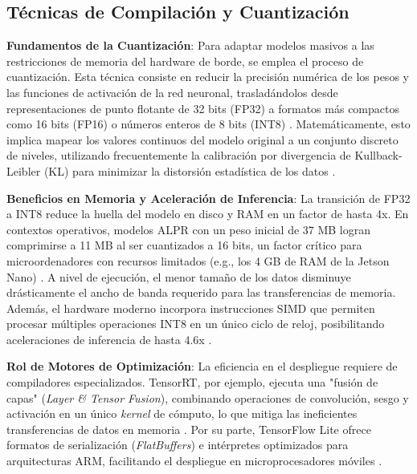 \subsection{Técnicas de Compilación y Cuantización}

\textbf{Fundamentos de la Cuantización}: 
Para adaptar modelos masivos a las restricciones de memoria del hardware de borde, se 
emplea el proceso de cuantización. Esta técnica consiste en reducir la precisión numérica 
de los pesos y las funciones de activación de la red neuronal, trasladándolos desde 
representaciones de punto flotante de 32 bits (FP32) a formatos más compactos como 16 bits 
(FP16) o números enteros de 8 bits (INT8) 
\parencite{sonnaraEfficientRealtimeLicense2025, swatiEfficientDeepLearning2024}. 
Matemáticamente, esto implica mapear los valores continuos del modelo original a un 
conjunto discreto de niveles, utilizando frecuentemente la calibración por divergencia 
de Kullback-Leibler (KL) para minimizar la distorsión estadística de los datos 
\parencite{ammarMultiStageDeepLearningBasedVehicle2023}.

\textbf{Beneficios en Memoria y Aceleración de Inferencia}: 
La transición de FP32 a INT8 reduce la huella del modelo en disco y RAM en un factor 
de hasta 4x. En contextos operativos, modelos ALPR con un peso inicial de 37 MB logran 
comprimirse a 11 MB al ser cuantizados a 16 bits, un factor crítico para microordenadores 
con recursos limitados (e.g., los 4 GB de RAM de la Jetson Nano) 
\parencite{sonnaraEfficientRealtimeLicense2025, swatiEfficientDeepLearning2024}. 
A nivel de ejecución, el menor tamaño de los datos disminuye drásticamente el ancho de 
banda requerido para las transferencias de memoria. Además, el hardware moderno incorpora 
instrucciones SIMD que permiten procesar múltiples operaciones INT8 en un único ciclo de 
reloj, posibilitando aceleraciones de inferencia de hasta 4.6x 
\parencite{ammarMultiStageDeepLearningBasedVehicle2023, sonnaraEfficientRealtimeLicense2025}.

\textbf{Rol de Motores de Optimización}: 
La eficiencia en el despliegue requiere de compiladores especializados. 
TensorRT, por ejemplo, ejecuta una "fusión de capas" (\textit{Layer \& Tensor Fusion}), 
combinando operaciones de convolución, sesgo y activación en un único \textit{kernel} de 
cómputo, lo que mitiga las ineficientes transferencias de datos en memoria 
\parencite{ammarMultiStageDeepLearningBasedVehicle2023, sonnaraEfficientRealtimeLicense2025}. 
Por su parte, TensorFlow Lite ofrece formatos de serialización (\textit{FlatBuffers}) e 
intérpretes optimizados para arquitecturas ARM, facilitando el despliegue en microprocesadores 
móviles \parencite{swatiEfficientDeepLearning2024}.

